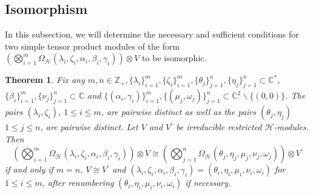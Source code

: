 \documentclass[12pt,reqno]{amsart}
\def\Z{\mathbb{Z}}
\def\C{\mathbb{C}}
\numberwithin{equation}{section}
\newtheorem{theo}{Theorem}[section]
\begin{document}
\subsection{Isomorphism} In this subsection, we will determine the necessary and sufficient conditions for two simple tensor product modules of the form $\left(\bigotimes_{i=1}^{m}\Omega_{\mathcal{H}}(\lambda_i, \zeta_i,\alpha_i,\beta_i,\gamma_i)\right)\otimes V$ to be isomorphic.



\begin{theo}\label{theo5.3}
Fix any $m,n\in\Z_+,\{\lambda_i\}_{i=1}^m,\{\zeta_i\}_{i=1}^m,\{\theta_j\}_{j=1}^n,\{\eta_j\}_{j=1}^n\subset\C^*$, $\{\beta_i\}_{i=1}^m,\{\nu_j\}_{j=1}^n\subset\C$ and $\{(\alpha_i, \gamma_i)\}_{i=1}^m,\{(\mu_j, \omega_j)\}_{j=1}^n\subset\C^2\backslash\{(0,0)\}$. The pairs $(\lambda_i,\zeta_i)$, $1\le i \le m$, are pairwise distinct as well as the pairs $(\theta_j,\eta_j)$ $1\le j \le n$, are pairwise distinct. Let $V$ and $V^\prime$ be irreducible restricted $\mathcal{H}$-modules. Then 
\[
    \left(\bigotimes_{i=1}^{m}\Omega_{\mathcal{H}}(\lambda_i, \zeta_i,\alpha_i,\beta_i,\gamma_i)\right)\otimes V\cong 
    \left(\bigotimes_{j=1}^{n}\Omega_{\mathcal{H}}(\theta_j, \eta_j,\mu_j,\nu_j,\omega_j)\right)\otimes V^\prime
\]
if and only if $m=n$, $V\cong V^\prime$ and $(\lambda_i,\zeta_i,\alpha_i,\beta_i, \gamma_i)=(\theta_i,\eta_i,\mu_i,\nu_i ,\omega_i)$ for $1\le i\le m$, after renumbering $(\theta_i,\eta_i,\mu_i, \nu_i,\omega_i)$ if necessary.
\end{theo}
\end{document}
